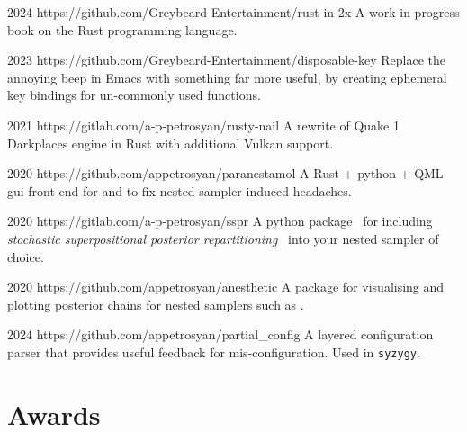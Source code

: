 \documentclass{CurriculumVitae}[10pt, condensed]
\begin{document}
%
{2024}%
{https://github.com/Greybeard-Entertainment/rust-in-2x}%
{%
  A work-in-progress book on the Rust programming language.
}%

%
{2023}%
{https://github.com/Greybeard-Entertainment/disposable-key}%
{%
  Replace the annoying beep in Emacs with something far more useful,
  by creating ephemeral key bindings for un-commonly used functions.
}%

%
{2021}%
{https://gitlab.com/a-p-petrosyan/rusty-nail}%
{%
  A rewrite of Quake 1 Darkplaces engine in Rust with additional
  Vulkan support.
}%

%
{2020}%
{https://github.com/appetrosyan/paranestamol}%
{%
  A Rust + python + QML gui front-end for  and 
  to fix nested sampler induced headaches.
}

%
{2020}%
{https://gitlab.com/a-p-petrosyan/sspr}%
{%
  A python package~\cite{sspr-mdpi} for including \emph{stochastic
    superpositional posterior repartitioning}~\cite{sspr} into your nested
  sampler of choice.
}%

%
{2020}%
{https://github.com/appetrosyan/anesthetic}%
{%
  A package for visualising and plotting posterior chains for nested
  samplers such as .
}
  
%
{2024}%
{https://github.com/appetrosyan/partial\_config}
{%
  A layered configuration parser that provides useful feedback for
  mis-configuration.  Used in \texttt{syzygy}.
}%

\vfill
\section*{Awards}
\setlength{\parindent}{0in}%






\end{document}

